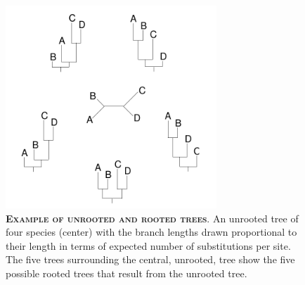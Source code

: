 \documentclass{svmult}
\begin{document}
\begin{figure}[t]
\centering
\includegraphics[height=3in]{fig1}
\caption{\textbf{\textsc{Example of unrooted and rooted trees}}.
An unrooted tree of four species (center) with the branch lengths drawn proportional
to their length in terms of expected number of substitutions per site. The five trees 
surrounding the central, unrooted, tree show the five possible rooted trees that result
from the unrooted tree. 
}
\label{fig1}
\end{figure}
\end{document}
